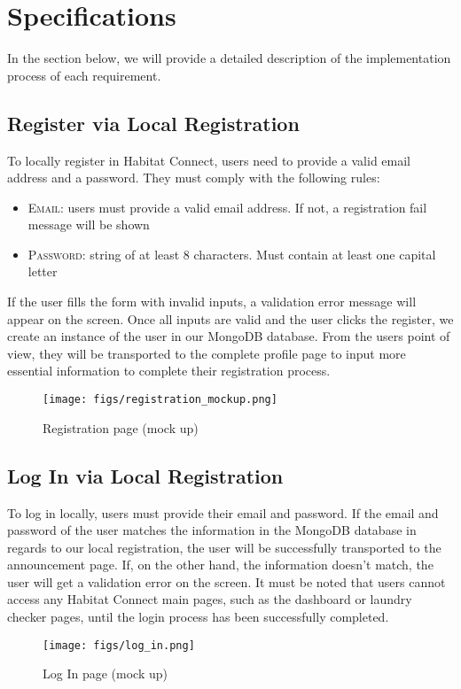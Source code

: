 \documentclass[conference]{IEEEtran}
\begin{document}
\section{Specifications}
In the section below, we will provide a detailed description of the implementation process of each requirement.
\subsection{Register via Local Registration}
To locally register in Habitat Connect, users need to provide a valid email address and a password. They must comply with the following rules:
\begin{itemize}
    \item \textsc{Email}: users must provide a valid email address. If not, a registration fail message will be shown
    \item \textsc{Password}: string of at least 8 characters. Must contain at least one capital letter
\end{itemize}
If the user fills the form with invalid inputs, a validation error message will appear on the screen. Once all inputs are valid and the user clicks the register, we create an instance of the user in our MongoDB database. From the users point of view, they will be transported to the complete profile page to input more essential information to complete their registration process.
\begin{figure}[H]
\centering
\texttt{[image: figs/registration\_mockup.png]}
\caption{Registration page (mock up)}
\label{fig:Registration mockup}
\end{figure}
\subsection{Log In via Local Registration}
To log in locally, users must provide their email and password. If the email and password of the user matches the information in the MongoDB database in regards to our local registration, the user will be successfully transported to the announcement page. If, on the other hand, the information doesn’t match, the user will get a validation error on the screen. It must be noted that users cannot access any Habitat Connect main pages, such as the dashboard or laundry checker pages, until the login process has been successfully completed.
\begin{figure}[H]
\centering
\texttt{[image: figs/log\_in.png]}
\caption{Log In page (mock up)}
\label{fig:Log In mockup}
\end{figure}
\end{document}
